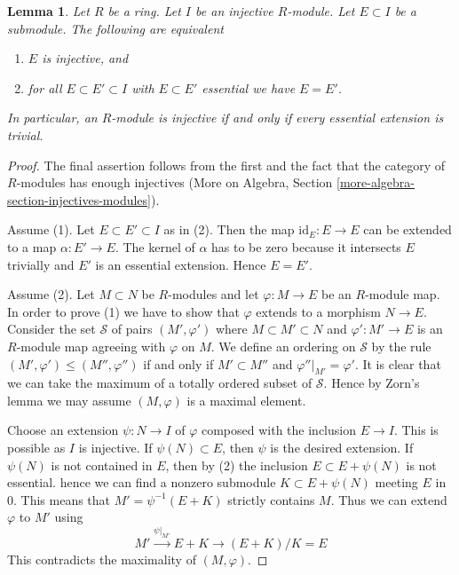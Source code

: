 \documentclass{stacks-project}
\theoremstyle{plain}
\newtheorem{lemma}[subsection]{Lemma}
\theoremstyle{definition}
\theoremstyle{remark}
\numberwithin{equation}{subsection}
\begin{document}
\begin{lemma}
\label{lemma-essential-extensions-in-injective}
Let $R$ be a ring. Let $I$ be an injective $R$-module. Let $E \subset I$
be a submodule. The following are equivalent
\begin{enumerate}
\item $E$ is injective, and
\item for all $E \subset E' \subset I$ with $E \subset E'$ essential
we have $E = E'$.
\end{enumerate}
In particular, an $R$-module is injective if and only if every essential
extension is trivial.
\end{lemma}

\begin{proof}
The final assertion follows from the first and the fact that the
category of $R$-modules has enough injectives
(More on Algebra, Section \ref{more-algebra-section-injectives-modules}).

\medskip\noindent
Assume (1). Let $E \subset E' \subset I$ as in (2).
Then the map $\text{id}_E : E \to E$ can be extended
to a map $\alpha : E' \to E$. The kernel of $\alpha$ has to be
zero because it intersects $E$ trivially and $E'$ is an essential
extension. Hence $E = E'$.

\medskip\noindent
Assume (2). Let $M \subset N$ be $R$-modules and let $\varphi : M \to E$
be an $R$-module map. In order to prove (1) we have to show that
$\varphi$ extends to a morphism $N \to E$. Consider the set $\mathcal{S}$
of pairs
$(M', \varphi')$ where $M \subset M' \subset N$ and $\varphi' : M' \to E$
is an $R$-module map agreeing with $\varphi$ on $M$. We define an ordering
on $\mathcal{S}$ by the rule $(M', \varphi') \leq (M'', \varphi'')$
if and only if $M' \subset M''$ and $\varphi''|_{M'} = \varphi'$.
It is clear that we can take the maximum of a totally ordered subset
of $\mathcal{S}$. Hence by Zorn's lemma we may assume $(M, \varphi)$
is a maximal element.

\medskip\noindent
Choose an extension $\psi : N \to I$ of $\varphi$ composed
with the inclusion $E \to I$. This is possible as $I$ is injective.
If $\psi(N) \subset E$, then $\psi$ is the desired extension.
If $\psi(N)$ is not contained in $E$, then by (2) the inclusion
$E \subset E + \psi(N)$ is not essential. hence
we can find a nonzero submodule $K \subset E + \psi(N)$ meeting $E$ in $0$.
This means that $M' = \psi^{-1}(E + K)$ strictly contains $M$.
Thus we can extend $\varphi$ to $M'$ using
$$
M' \xrightarrow{\psi|_{M'}} E + K \to (E + K)/K = E
$$
This contradicts the maximality of $(M, \varphi)$.
\end{proof}
\end{document}
